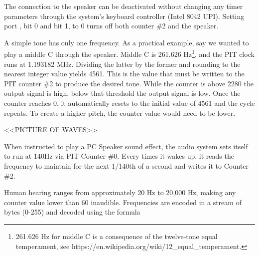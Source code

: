 \documentclass[book.tex]{subfiles}
\begin{document}
\par
The connection to the speaker can be deactivated without changing any timer parameters through the system's keyboard controller (Intel 8042 UPI). Setting port , bit 0 and bit 1, to 0 turns off both counter \#2 and the speaker.\\

\par
\begin{minipage}{\textwidth}

\end{minipage}

\par
A simple tone has only one frequency. As a practical example, say we wanted to play a middle C through the speaker. Middle C is 261.626 Hz\footnote{261.626 Hz for middle C is a consequence of the twelve-tone equal temperament, see https://en.wikipedia.org/wiki/12\_equal\_temperament.}, and the PIT clock runs at 1.193182 MHz. Dividing the latter by the former and rounding to the nearest integer value yields 4561. This is the value that must be written to the PIT counter \#2 to produce the desired tone. While the counter is above 2280 the output signal is high, below that threshold the output signal is low. Once the counter reaches 0, it automatically resets to the initial value of 4561 and the cycle repeats. To create a higher pitch, the counter value would need to be lower. \\

\par
<<PICTURE OF WAVES>>\\

\par
When instructed to play a PC Speaker sound effect, the audio system sets itself to run at 140Hz via PIT Counter \#0. Every times it wakes up, it reads the frequency to maintain for the next 1/140th of a second and writes it to Counter \#2.\\

\par
Human hearing ranges from approximately 20 Hz to 20,000 Hz, making any counter value lower than 60 inaudible. Frequencies are encoded in a stream of bytes (0-255) and decoded using the formula\\

\par
\begin{minipage}{\textwidth}

\end{minipage}
\end{document}
